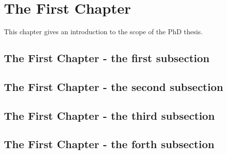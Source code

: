 \chapter{The First Chapter}
    \minitoc
    \vfill
    \begin{mybox}
        This chapter gives an introduction to the scope of the PhD thesis. \\
        \blindtext[2] 
    \end{mybox}
    \newpage
    \blindtext[10]
    \newpage
    \section{The First Chapter - the first subsection}
        \blindtext[10] 
        \newpage
    \section{The First Chapter - the second subsection}
        \blindtext[10] 
        \newpage
    \section{The First Chapter - the third subsection}
        \blindtext[10] 
        \newpage
    \section{The First Chapter - the forth subsection}
        \blindtext[10]
        \newpage